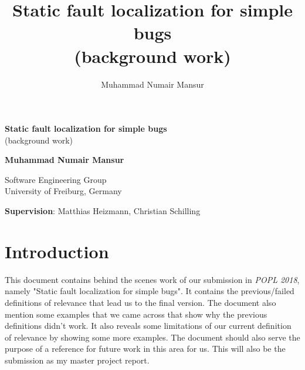 \documentclass{article}
\title{Static fault localization for simple bugs \\ \normalsize{(background work)}}
\author{Muhammad Numair Mansur}
\affil{University of Freiburg, Germany}
\date{\vspace{-5ex}}
\begin{document}
\begin{titlepage}
    \begin{center}
        \vspace*{1cm}
        \Large
        \textbf{Static fault localization for simple bugs} \\
        \large
        (background work)
        \vspace{0.5cm}
   
        
        \vspace{5cm}
        \large
        \textbf{Muhammad Numair Mansur}
                
        \vspace{0.5cm}
        
        
        Software Engineering Group\\
        University of Freiburg, Germany
        
    \end{center}
    \vspace{8cm}
    \textbf{Supervision}: Matthias Heizmann, Christian Schilling
\end{titlepage}
\section{Introduction}
This document contains behind the scenes work of our submission in \textit{POPL 2018}, namely "Static fault localization for simple bugs". It contains the previous/failed definitions of relevance that lead us to the final version. The document also mention some examples that we came across that show why the previous definitions didn't work. It also reveals some limitations of our current definition of relevance by showing some more examples. The document should also serve the purpose of a reference for future work in this area for us. This will also be the submission as my master project report.
\end{document}
